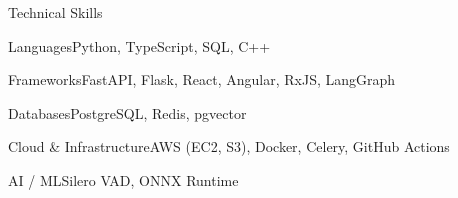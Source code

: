 \documentclass[
	11pt
]{../../../template}
\begin{document}
	\begin{rSection}{T}{echnical Skills}
		\begin{rSet}{Languages}{Python, TypeScript, SQL, C++}
		\end{rSet}
		\begin{rSet}{Frameworks}{FastAPI, Flask, React, Angular, RxJS, LangGraph}
		\end{rSet}
		\begin{rSet}{Databases}{PostgreSQL, Redis, pgvector}
		\end{rSet}
		\begin{rSet}{Cloud \& Infrastructure}{AWS (EC2, S3), Docker, Celery, GitHub Actions}
		\end{rSet}
		\begin{rSet}{AI / ML}{Silero VAD, ONNX Runtime}
		\end{rSet}
	\end{rSection}
\end{document}
